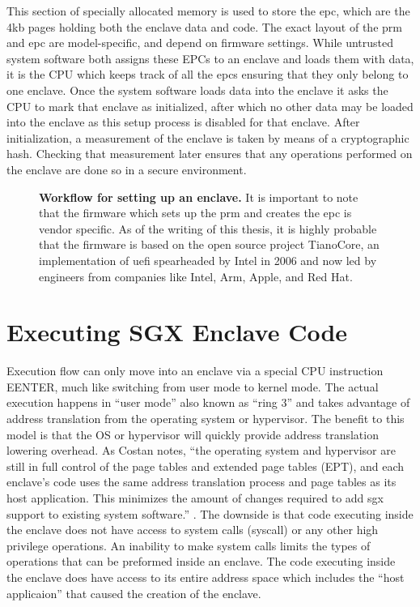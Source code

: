 This section of specially allocated memory is used to store the \gls{epc}, which are the 4kb pages holding both the enclave data and code. The exact layout of the \gls{prm} and \gls{epc} are model-specific, and depend on firmware settings. While untrusted system software both assigns these EPCs to an enclave and loads them with data, it is the CPU which keeps track of all the \gls{epc}s ensuring that they only belong to one enclave. Once the system software loads data into the enclave it asks the CPU to mark that enclave as initialized, after which no other data may be loaded into the enclave as this setup process is disabled for that enclave. After initialization, a \gls{measurement} of the enclave is taken by means of a cryptographic hash. Checking that \gls{measurement} later ensures that any operations performed on the enclave are done so in a secure environment.

\begin{figure}[hb]
\centering

\caption[Setting Up Intel SGX]{\textbf{Workflow for setting up an enclave.} It is important to note that the firmware which sets up the \gls{prm} and creates the \gls{epc} is vendor specific. As of the writing of this thesis, it is highly probable that the firmware is based on the open source project TianoCore, an implementation of \gls{uefi} spearheaded by Intel in 2006 and now led by engineers from companies like Intel, Arm, Apple, and Red Hat.}
\label{fig:sgx-setup}
\end{figure}

\section{Executing SGX Enclave Code}
Execution flow can only move into an enclave via a special CPU instruction EENTER, much like switching from user mode to kernel mode. The actual execution happens in ``user mode'' also known as ``\gls{ring} 3'' and takes advantage of address translation from the operating system or hypervisor. The benefit to this model is that the OS or hypervisor will quickly provide address translation lowering overhead. As Costan notes, ``the operating system and hypervisor are still in full control of the page tables and extended page tables (EPT), and each enclave's code uses the same address translation process and page tables as its host application. This minimizes the amount of changes required to add \gls{sgx} support to existing system software.'' \cite{Costan2016}. The downside is that code executing inside the enclave does not have access to system calls (syscall) or any other high privilege operations. An inability to make system calls limits the types of operations that can be preformed inside an enclave. The code executing inside the enclave does have access to its entire address space which includes the ``host applicaion'' that caused the creation of the enclave.


